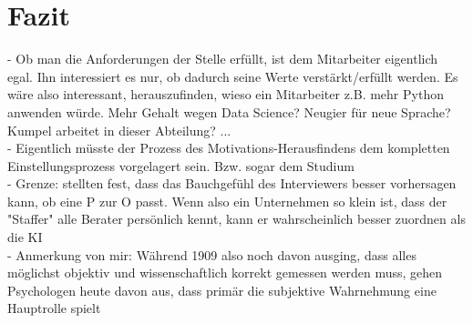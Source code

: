 \section{Fazit}
\label{ch:fazit}
- Ob man die Anforderungen der Stelle erfüllt, ist dem Mitarbeiter eigentlich egal. Ihn interessiert es nur, ob dadurch seine Werte verstärkt/erfüllt werden. Es wäre also interessant, herauszufinden, wieso ein Mitarbeiter z.B. mehr Python anwenden würde. Mehr Gehalt wegen Data Science? Neugier für neue Sprache? Kumpel arbeitet in dieser Abteilung? ... \\
- Eigentlich müsste der Prozess des Motivations-Herausfindens dem kompletten Einstellungsprozess vorgelagert sein. Bzw. sogar dem Studium \\
- Grenze: \textcite{cable:1997} stellten fest, dass das Bauchgefühl des Interviewers besser vorhersagen kann, ob eine P zur O passt. Wenn also ein Unternehmen so klein ist, dass der "Staffer" alle Berater persönlich kennt, kann er wahrscheinlich besser zuordnen als die KI \\
- Anmerkung von mir: Während \textcite{parsons:1909} 1909 also noch davon ausging, dass alles möglichst objektiv und wissenschaftlich korrekt gemessen werden muss, gehen Psychologen heute davon aus, dass primär die subjektive Wahrnehmung eine Hauptrolle spielt \\

